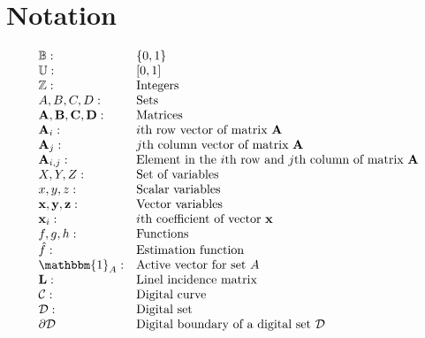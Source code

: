 \chapter{Notation}
\label{chapter:notation}

\[
\begin{array}{ll}
\mathbb{B}: & \{0,1\}\\
\mathbb{U}: & [0,1]\\
\mathbb{Z}: & \text{Integers}\\
A,B,C,D: & \text{Sets}\\
\mathbf{A,B,C,D}: & \text{Matrices}\\
\mathbf{A}_i: & \text{$i$th row vector of matrix $\mathbf{A}$}\\
\mathbf{A}_j: & \text{$j$th column vector of matrix $\mathbf{A}$}\\
\mathbf{A}_{i,j}: & \text{Element in the $i$th row and $j$th column of matrix $\mathbf{A}$}\\
X,Y,Z: & \text{Set of variables}\\
x,y,z: & \text{Scalar variables}\\
\mathbf{x,y,z}: & \text{Vector variables}\\
\mathbf{x}_i: & \text{$i$th coefficient of vector $\mathbf{x}$}\\
f,g,h: & \text{Functions}\\
\hat{f}: & \text{Estimation function}\\
\mathbbm{1}_A: & \text{Active vector for set $A$}\\
\mathbf{L}: & \text{Linel incidence matrix}\\
\mathcal{C}: & \text{Digital curve} \\
\mathcal{D}: & \text{Digital set} \\
\partial \mathcal{D} & \text{Digital boundary of a digital set $\mathcal{D}$}
\end{array}
\]
